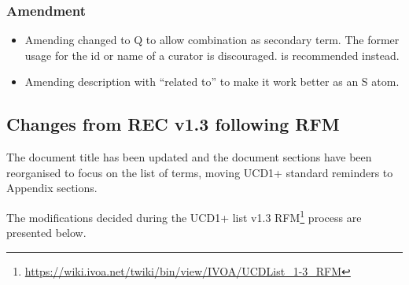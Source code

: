 \documentclass[11pt,a4paper]{ivoa}
\begin{document}
\subsubsection*{Amendment}
\begin{itemize}
\item Amending  changed to Q to allow combination as secondary term.
The former usage  for the id or name of a curator is
discouraged.  is recommended instead.
\item Amending  description with ``related to'' to make
it work better as an S atom.
\end{itemize}

\subsection{Changes from REC v1.3 following RFM}
The document title has been updated and the document sections have been reorganised to focus on 
the list of terms, moving UCD1+ standard reminders to Appendix sections. 

The modifications decided during the UCD1+ list v1.3 
RFM\footnote{\url{https://wiki.ivoa.net/twiki/bin/view/IVOA/UCDList_1-3_RFM}} process are presented below.

\end{document}
